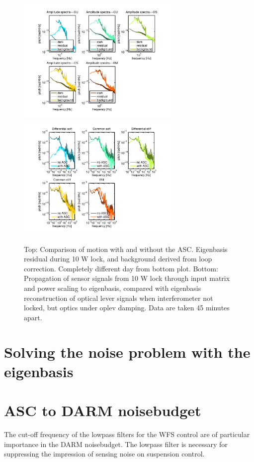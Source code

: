 \begin{figure}
\begin{centering}
\includegraphics[width=0.7\textwidth]{figures/ASCdofsignals.pdf}
\includegraphics[width=0.7\textwidth]{figures/ASConoff.pdf}
\caption{Top: Comparison of motion with and without the
  ASC. Eigenbasis residual during 10 W lock, and background derived
  from loop correction. Completely different day from bottom
  plot. Bottom: Propagation of sensor signals from 10 W lock through
  input matrix and power scaling to eigenbasis, compared with
  eigenbasis reconstruction of optical lever signals when
  interferometer not locked, but optics under oplev damping. Data are
  taken 45 minutes apart.}
\label{fig:}
\end{centering}
\end{figure}


\section{Solving the noise problem with the eigenbasis}




\section{ASC to DARM noisebudget}
The cut-off frequency of the lowpass filters for the WFS control are
of particular importance in the DARM noisebudget. The lowpass filter
is necessary for suppressing the impression of sensing noise on
suspension control. 

